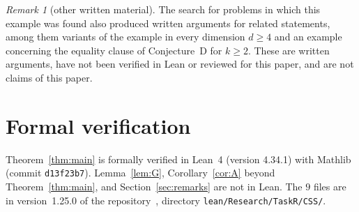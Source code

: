 \documentclass[11pt]{article}
\theoremstyle{definition}
\theoremstyle{remark}
\newtheorem{remark}{Remark}
\newcommand{\repoversion}{1.25.0}
\begin{document}
\begin{remark}[other written material]
The search for problems in which this example was found also produced written
arguments for related statements, among them variants of the example in every
dimension $d\ge4$ and an example concerning the equality clause of
Conjecture~D for $k\ge2$. These are written arguments, have not been verified
in Lean or reviewed for this paper, and are not claims of this paper.
\end{remark}

{\sloppy
\section{Formal verification}\label{sec:lean}

Theorem~\ref{thm:main} is formally verified in Lean~4 (version 4.34.1) with
Mathlib~\cite{mathlib} (commit \texttt{d13f23b7}). Lemma~\ref{lem:G},
Corollary~\ref{cor:A} beyond Theorem~\ref{thm:main}, and
Section~\ref{sec:remarks} are not in Lean. The $9$ files are in
version~\repoversion{} of the repository~\cite{repo}, directory
\texttt{lean/Research/TaskR/CSS/}.

}
\end{document}
